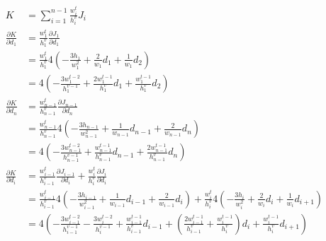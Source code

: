 \documentclass{article}
\begin{document}
\begin{align*}
  K &= \sum_{i=1}^{n-1}\frac{w_i^t}{h_i^v}J_i \\
  \frac{\partial K}{\partial d_1}
  &= \frac{w_1^t}{h_1^v}\frac{\partial J_1}{\partial d_1} \\
  &= \frac{w_1^t}{h_1^v}4\left(-\frac{3h_1}{w_1^2}+\frac{2}{w_1}d_1+\frac{1}{w_1}d_2\right) \\
  &= 4\left(-\frac{3w_1^{t-2}}{h_1^{v-1}}+\frac{2w_1^{t-1}}{h_1^v}d_1+\frac{w_1^{t-1}}{h_1^v}d_2\right) \\
  \frac{\partial K}{\partial d_n}
  &= \frac{w_{n-1}^t}{h_{n-1}^v}\frac{\partial J_{n-1}}{\partial d_n} \\
  &= \frac{w_{n-1}^t}{h_{n-1}^v}4\left(-\frac{3h_{n-1}}{w_{n-1}^2}+\frac{1}{w_{n-1}}d_{n-1}+\frac{2}{w_{n-1}}d_n\right) \\
  &= 4\left(-\frac{3w_{n-1}^{t-2}}{h_{n-1}^{v-1}}+\frac{w_{n-1}^{t-1}}{h_{n-1}^v}d_{n-1}+\frac{2w_{n-1}^{t-1}}{h_{n-1}^v}d_n\right) \\
  \frac{\partial K}{\partial d_i}
  &= \frac{w_{i-1}^t}{h_{i-1}^v}\frac{\partial J_{i-1}}{\partial d_i}
  + \frac{w_i^t}{h_i^v}\frac{\partial J_i}{\partial d_i} \\
  &= \frac{w_{i-1}^t}{h_{i-1}^v}4\left(-\frac{3h_{i-1}}{w_{i-1}^2}+\frac{1}{w_{i-1}}d_{i-1}+\frac{2}{w_{i-1}}d_i\right)
  + \frac{w_i^t}{h_i^v}4\left(-\frac{3h_i}{w_i^2}+\frac{2}{w_i}d_i+\frac{1}{w_i}d_{i+1}\right) \\
  &= 4\left(
  -\frac{3w_{i-1}^{t-2}}{h_{i-1}^{v-1}}-\frac{3w_i^{t-2}}{h_i^{v-1}}
  +\frac{w_{i-1}^{t-1}}{h_{i-1}^v}d_{i-1}
  +\left(\frac{2w_{i-1}^{t-1}}{h_{i-1}^v}+\frac{w_i^{t-1}}{h_i^v}\right)d_i
  +\frac{w_i^{t-1}}{h_i^v}d_{i+1}
  \right)
\end{align*}
\end{document}
